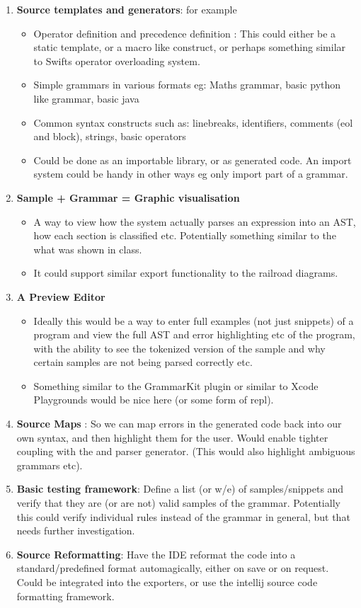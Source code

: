 \documentclass{l3proj}
\begin{document}
\begin {enumerate}
	\item \textbf{Source templates and generators}: for example
	  \begin {itemize}
		\item Operator definition and precedence definition : This could either be a static template, or a macro like construct, or perhaps something similar to Swifts operator overloading system.
		\item Simple grammars in various formats eg: Maths grammar, basic python like grammar, basic java
		\item Common syntax constructs such as: linebreaks, identifiers, comments (eol and block), strings, basic operators
		\item Could be done as an importable library, or as generated code. An import system could be handy in other ways eg only import part of a grammar.
	  \end {itemize}
      \item \textbf{Sample + Grammar = Graphic visualisation}
	  \begin {itemize}
		\item A way to view how the system actually parses an expression into an AST, how each section is classified etc. Potentially something similar to the what was shown in class.
		\item It could support similar export functionality to the railroad diagrams.
	  \end {itemize}
      \item \textbf{ A Preview Editor }
	  \begin {itemize}
		\item Ideally this would be a way to enter full examples (not just snippets) of a program and view the full AST and error highlighting etc of the program, with the ability to see the tokenized version of the sample and why certain samples are not being parsed correctly etc.
		\item Something similar to the GrammarKit plugin or similar to Xcode Playgrounds would be nice here (or some form of repl).
	  \end {itemize}
      \item \textbf{Source Maps} : So we can map errors in the generated code back into our own syntax, and then highlight them for the user. Would enable tighter coupling with the and parser generator. (This would also highlight ambiguous grammars etc).
            \item \textbf{Basic testing framework}: Define a list (or w/e) of samples/snippets and verify that they are (or are not)  valid samples of the grammar. Potentially this could verify individual rules instead of the grammar in general, but that needs further investigation.
            \item \textbf{Source Reformatting}: Have the IDE reformat the code into a standard/predefined format automagically, either on save or on request.  Could be integrated into the exporters, or use the intellij source code formatting framework.

\end{enumerate}
\end{document}

